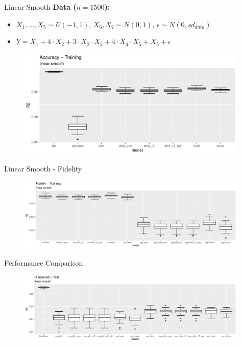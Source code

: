 \documentclass[9pt, xcolor=table]{beamer}
\begin{document}
\begin{frame}{Linear Smooth}
\textbf{Data ($n= 1500$):}
\begin{itemize}
    \item $X_1,..., X_5 \sim U(-1,1)$, $X_6, X_7 \sim N(0,1)$, $\epsilon \sim N(0, sd_{data})$
    \item $ Y = X_1 + 4 \cdot X_2 + 3 \cdot X_2 \cdot X_3 + 4\cdot X_4\cdot X_5 + X_5 + \epsilon $
\end{itemize}

\begin{figure}
    \includegraphics[width=11cm]{Figures/Performance/linear_smooth/r2_acc_train.pdf}
\end{figure}
\end{frame}

\begin{frame}{Linear Smooth - Fidelity}
\begin{figure}
    \includegraphics[width=11cm]{Figures/Performance/linear_smooth/r2_fidelity_train.pdf}
\end{figure}
    
\end{frame}

\begin{frame}{Performance Comparison}
\begin{figure}
    \includegraphics[width=11cm]{Figures/Performance/linear_smooth/r2_test.pdf}
\end{figure}
\end{frame}
\end{document}
